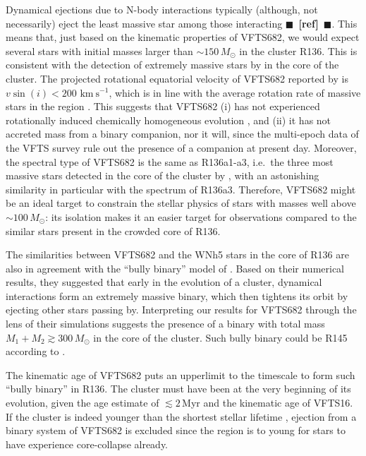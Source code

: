 \documentclass[apjl,twocolumn]{emulateapj}
\newcommand{\todo}[1]{{\large $\blacksquare$~\textbf{\color{red}[#1]}}~$\blacksquare$}
\newcommand{\kms}{{\,\mathrm{km\ s^{-1}}}}
\begin{document}
Dynamical ejections due to N-body interactions typically (although, not necessarily) eject the least
massive star among those interacting \todo{ref}. This means that, just
based on the kinematic properties of VFTS682, we would expect several
stars with initial masses larger than $\sim$$150\,M_\odot$ in the
cluster R136.
This is consistent with the detection
of extremely massive stars by \cite{crowther:10} in the core of the
cluster. The projected rotational equatorial velocity of VFTS682
reported by \cite{schneider:18} is $v\sin(i)<200\,\kms$, which is in
line with the average rotation rate of massive stars in the region
\citep[][]{ramirez-agudelo:15}. This suggests that VFTS682 (i) has not
experienced rotationally induced chemically homogeneous evolution
\citep[][]{maeder:00,demink:09,marchant:16}, and (ii) it has not
accreted mass from a binary companion, nor it will, since the multi-epoch
data of the VFTS survey rule out the presence of a companion at
present day. Moreover, the spectral type of VFTS682
\citep[WNh5,][]{bestenlehner:11} is the same as R136a1-a3, i.e.~the
three most massive stars detected in the core of the cluster by
\cite{crowther:10}, with an astonishing similarity in particular with
the spectrum of R136a3. Therefore,
VFTS682 might be an ideal target to constrain the stellar physics of
stars with masses well above $\sim$$100\,M_\odot$: its isolation makes
it an easier target for observations compared to the similar stars
present in the crowded core of R136.

The similarities between VFTS682 and the WNh5 stars in the core of
R136 are also in agreement with the ``bully binary'' model of
\cite{fujii:11}. Based on their numerical results, they suggested that
early in the evolution of a cluster, dynamical interactions form an extremely
massive binary, which then tightens its orbit by ejecting other stars passing
by. Interpreting our results for VFTS682 through the lens of their simulations
suggests the presence of a binary with total mass
$M_1+M_2\gtrsim 300\,M_\odot$ in the core of the cluster. Such bully
binary could be R145 according to \cite{fujii:11}.

The kinematic age of VFTS682 puts an
upperlimit to the timescale to form such ``bully binary'' in
R136. The cluster must have been at the very beginning of its
evolution, given the age estimate of $\lesssim 2$\,Myr
\cite{crowther:10,sabbi:12} and the kinematic age of VFTS16. If the
cluster is indeed younger than the shortest stellar lifetime
\citep[$\sim$3\,Myr, e.g.,][]{zapartas:17}, ejection from a binary
system of VFTS682 is excluded since the region is to young for stars
to have experience core-collapse already.
\end{document}
